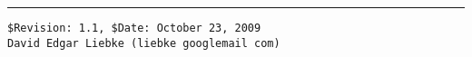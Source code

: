 \documentclass[footexclude,twocolumn,DIV25,fontsize=10pt]{scrreprt}
\begin{document}
\begin{flushright}
\footnotesize
\rule{0.7\linewidth}{0.25pt}
\verb!$Revision: 1.1, $Date: October 23, 2009!\\
\verb!David Edgar Liebke (liebke googlemail com)!
\end{flushright}

%
%
\end{document}
